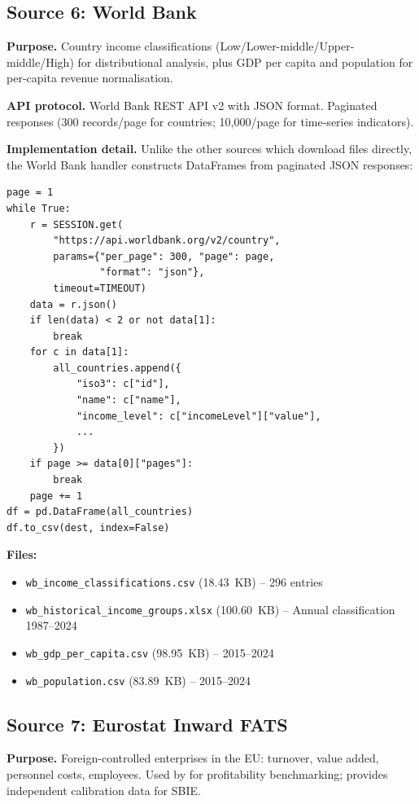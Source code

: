 \documentclass[12pt,a4paper]{article}
\begin{document}
\subsection{Source 6: World Bank}\label{sec:src_wb}

\textbf{Purpose.}
Country income classifications (Low/Lower-middle/Upper-middle/High) for distributional analysis, plus GDP per capita and population for per-capita revenue normalisation.

\textbf{API protocol.}
World Bank REST API v2 with JSON format.
Paginated responses (300 records/page for countries; 10,000/page for time-series indicators).

\textbf{Implementation detail.}
Unlike the other sources which download files directly, the World Bank handler constructs DataFrames from paginated JSON responses:

\begin{lstlisting}[caption={World Bank pagination loop (simplified)}]
page = 1
while True:
    r = SESSION.get(
        "https://api.worldbank.org/v2/country",
        params={"per_page": 300, "page": page,
                "format": "json"},
        timeout=TIMEOUT)
    data = r.json()
    if len(data) < 2 or not data[1]:
        break
    for c in data[1]:
        all_countries.append({
            "iso3": c["id"],
            "name": c["name"],
            "income_level": c["incomeLevel"]["value"],
            ...
        })
    if page >= data[0]["pages"]:
        break
    page += 1
df = pd.DataFrame(all_countries)
df.to_csv(dest, index=False)
\end{lstlisting}

\textbf{Files:}
\begin{itemize}[nosep]
    \item \texttt{wb\_income\_classifications.csv} (18.43~KB) -- 296 entries
    \item \texttt{wb\_historical\_income\_groups.xlsx} (100.60~KB) -- Annual classification 1987--2024
    \item \texttt{wb\_gdp\_per\_capita.csv} (98.95~KB) -- 2015--2024
    \item \texttt{wb\_population.csv} (83.89~KB) -- 2015--2024
\end{itemize}


\subsection{Source 7: Eurostat Inward FATS}\label{sec:src_eurostat}

\textbf{Purpose.}
Foreign-controlled enterprises in the EU: turnover, value added, personnel costs, employees.
Used by \textcite{torslov2022} for profitability benchmarking; provides independent calibration data for SBIE.
\end{document}
